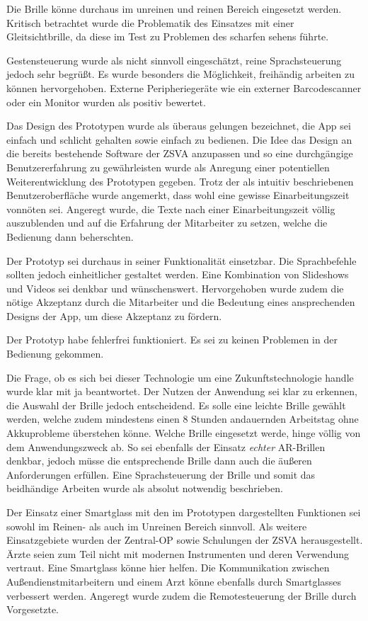 Die Brille könne durchaus im unreinen und reinen Bereich eingesetzt werden. Kritisch betrachtet wurde die Problematik des Einsatzes mit einer Gleitsichtbrille, da diese im Test zu Problemen des scharfen sehens führte.

Gestensteuerung wurde als nicht sinnvoll eingeschätzt, reine Sprachsteuerung jedoch sehr begrüßt. Es wurde besonders die Möglichkeit, freihändig arbeiten zu können hervorgehoben. Externe Peripheriegeräte wie ein externer Barcodescanner oder ein Monitor wurden als positiv bewertet.

Das Design des Prototypen wurde als überaus gelungen bezeichnet, die App sei einfach und schlicht gehalten sowie einfach zu bedienen. Die Idee das Design an die bereits bestehende Software der ZSVA anzupassen und so eine durchgängige Benutzererfahrung zu gewährleisten wurde als Anregung einer potentiellen Weiterentwicklung des Prototypen gegeben. Trotz der als intuitiv beschriebenen Benutzeroberfläche wurde angemerkt, dass wohl eine gewisse Einarbeitungszeit vonnöten sei. Angeregt wurde, die Texte nach einer Einarbeitungszeit völlig auszublenden und auf die Erfahrung der Mitarbeiter zu setzen, welche die Bedienung dann beherschten. 

Der Prototyp sei durchaus in seiner Funktionalität einsetzbar. Die Sprachbefehle sollten jedoch einheitlicher gestaltet werden. Eine Kombination von Slideshows und Videos sei denkbar und wünschenswert. Hervorgehoben wurde zudem die nötige Akzeptanz durch die Mitarbeiter und die Bedeutung eines ansprechenden Designs der App, um diese Akzeptanz zu fördern.

Der Prototyp habe fehlerfrei funktioniert. Es sei zu keinen Problemen in der Bedienung gekommen.

Die Frage, ob es sich bei dieser Technologie um eine Zukunftstechnologie handle wurde klar mit ja beantwortet. Der Nutzen der Anwendung sei klar zu erkennen, die Auswahl der Brille jedoch entscheidend. Es solle eine leichte Brille gewählt werden, welche zudem mindestens einen 8 Stunden andauernden Arbeitstag ohne Akkuprobleme überstehen könne. Welche Brille eingesetzt werde, hinge völlig von dem Anwendungszweck ab. So sei ebenfalls der Einsatz \emph{echter} AR-Brillen denkbar, jedoch müsse die entsprechende Brille dann auch die äußeren Anforderungen erfüllen. Eine Sprachsteuerung der Brille und somit das beidhändige Arbeiten wurde als absolut notwendig beschrieben. 

Der Einsatz einer Smartglass mit den im Prototypen dargestellten Funktionen sei sowohl im Reinen- als auch im Unreinen Bereich sinnvoll. Als weitere Einsatzgebiete wurden der Zentral-OP sowie Schulungen der ZSVA herausgestellt. Ärzte seien zum Teil nicht mit modernen Instrumenten und deren Verwendung vertraut. Eine Smartglass könne hier helfen. Die Kommunikation zwischen Außendienstmitarbeitern und einem Arzt könne ebenfalls durch Smartglasses verbessert werden. Angeregt wurde zudem die Remotesteuerung der Brille durch Vorgesetzte.

